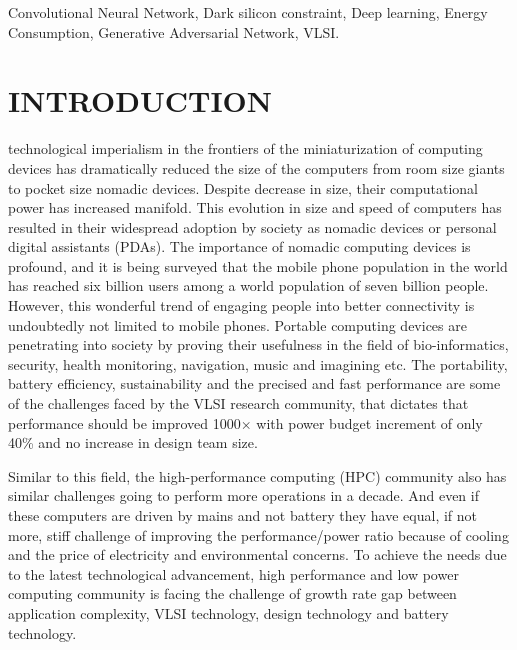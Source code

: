 \documentclass[journal]{IEEEtran}
\begin{document}
\begin{IEEEkeywords}
Convolutional Neural Network, Dark silicon constraint, Deep learning, Energy Consumption, Generative Adversarial Network, VLSI.
\end{IEEEkeywords}

\section{INTRODUCTION}

 technological imperialism in the frontiers of the miniaturization of computing devices has dramatically reduced the size of the computers from room size giants to pocket size nomadic devices. Despite decrease in size, their computational power has increased manifold. This evolution in size and speed of computers has resulted in their widespread adoption by society as nomadic devices or personal digital assistants (PDAs). The importance of nomadic computing devices is profound, and it is being surveyed that the mobile phone population in the world has reached six billion users among a world population of seven billion people. However, this wonderful trend of engaging people into better connectivity is undoubtedly not limited to mobile phones. Portable computing devices are penetrating into society by proving their usefulness in the field of bio-informatics, security, health monitoring, navigation, music and imagining etc. The portability, battery efficiency, sustainability and the precised and fast performance are some of the challenges faced by the VLSI research community, that dictates that performance should be improved 1000$\times$ with power budget increment of only 40\% and no increase in design team size. 

\par Similar to this field, the high-performance computing (HPC) community also has similar challenges going to perform more operations in a decade. And even if these computers are driven by mains and not battery they have equal, if not more, stiff challenge of improving the performance/power ratio because of cooling and the price of electricity and environmental concerns. To achieve the needs due to the latest technological advancement, high performance and low power computing community is facing the challenge of growth rate gap between application complexity, VLSI technology, design technology and battery technology.
\end{document}
